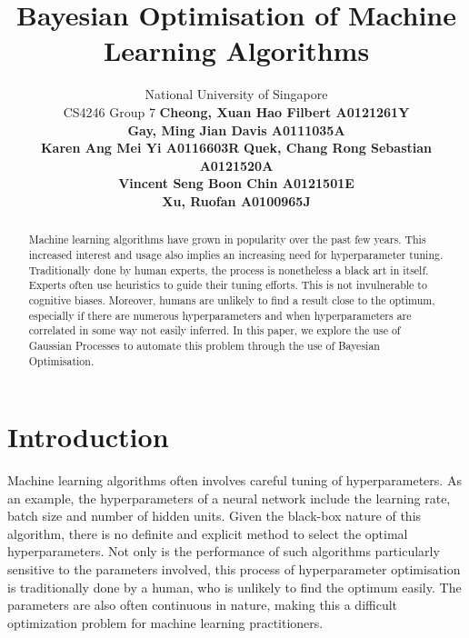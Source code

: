 \documentclass[letterpaper]{article}
\begin{document}
%
\title{Bayesian Optimisation of Machine Learning Algorithms}
\author{
National University of Singapore \\
CS4246 Group 7 \AND
\normalsize\normalfont\textbf{Cheong, Xuan Hao Filbert A0121261Y} \\
\normalsize\normalfont\textbf{Gay, Ming Jian Davis A0111035A} \\
\normalsize\normalfont\textbf{Karen Ang Mei Yi A0116603R} \And
\normalsize\normalfont\textbf{Quek, Chang Rong Sebastian A0121520A} \\
\normalsize\normalfont\textbf{Vincent Seng Boon Chin A0121501E} \\
\normalsize\normalfont\textbf{Xu, Ruofan A0100965J}
}

\maketitle
\begin{abstract}
Machine learning algorithms have grown in popularity over the past few years.
This increased interest and usage also implies an increasing need for
hyperparameter tuning. Traditionally done by human experts, the process is
nonetheless a black art in itself. Experts often use heuristics to guide their
tuning efforts. This is not invulnerable to cognitive biases. Moreover, humans
are unlikely to find a result close to the optimum, especially if there are
numerous hyperparameters and when hyperparameters are correlated in some way
not easily inferred. In this paper, we explore the use of Gaussian Processes to
automate this problem through the use of Bayesian Optimisation.
\end{abstract}

\section{Introduction}
\noindent Machine learning algorithms often involves careful tuning of hyperparameters.
As an example, the hyperparameters of a neural network include the learning rate,
batch size and number of hidden units. Given the black-box nature of this algorithm,
there is no definite and explicit method to select the optimal hyperparameters.
Not only is the performance of such algorithms particularly sensitive to the
parameters involved, this process of hyperparameter optimisation is traditionally
done by a human, who is unlikely to find the optimum easily. The parameters are
also often continuous in nature, making this a difficult optimization problem for
machine learning practitioners.
\end{document}
